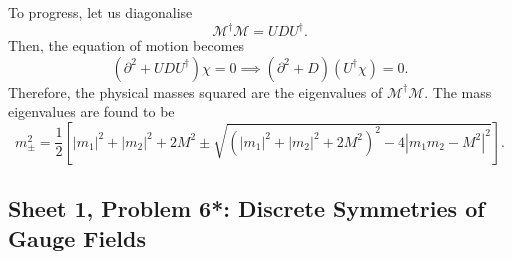 \begin{solution}
\begin{equation}
    \end{equation}
    To progress, let us diagonalise
\begin{equation}
    \mathcal{M}^\dagger \mathcal{M} = U D U^\dagger.
\end{equation}
Then, the equation of motion becomes
\begin{equation}
    (\partial^2 + UDU^\dagger) \chi = 0
    \implies
    (\partial^2 + D)(U^\dagger\chi) = 0.
\end{equation}
Therefore, the physical masses squared are the eigenvalues of
$\mathcal{M}^\dagger\mathcal{M}$. The mass eigenvalues are found to be
\begin{equation}
        m_\pm^2
    =
    \frac{1}{2}\left[
    |m_1|^2+|m_2|^2+2M^2
    \pm
    \sqrt{
    \left(|m_1|^2+|m_2|^2+2M^2\right)^2
    -4|m_1m_2-M^2|^2
    }
    \right].
\end{equation}

\end{solution}

\subsection{Sheet 1, Problem 6*: Discrete Symmetries of Gauge Fields}

